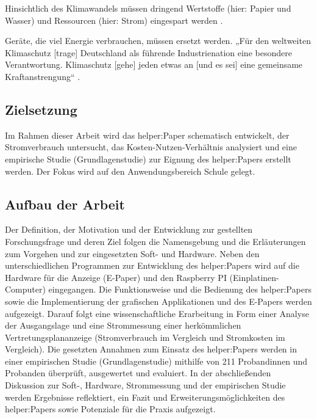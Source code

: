 \documentclass[10pt]{article}
\begin{document}
Hinsichtlich des Klimawandels müssen dringend Wertstoffe (hier: Papier und Wasser) und Ressourcen (hier: Strom) eingespart werden \cite{Ressourcenschutz}.

Geräte, die viel Energie verbrauchen, müssen ersetzt werden. „Für den weltweiten Klimaschutz [trage] Deutschland als führende Industrienation eine besondere Verantwortung. Klimaschutz [gehe] jeden etwas an [und es sei] eine gemeinsame Kraftanstrengung“ \cite{Klimaschutzprogramm}.



\subsection{Zielsetzung}
Im Rahmen dieser Arbeit wird das helper:Paper schematisch entwickelt, der Stromverbrauch untersucht, das Kosten-Nutzen-Verhältnis analysiert und eine empirische Studie (Grundlagenstudie) zur Eignung des helper:Papers erstellt werden. Der Fokus wird auf den Anwendungsbereich Schule gelegt. 


\subsection{Aufbau der Arbeit}
Der Definition, der Motivation und der Entwicklung zur gestellten Forschungsfrage und deren Ziel folgen die Namensgebung und die Erläuterungen zum Vorgehen und zur eingesetzten Soft- und Hardware. Neben den unterschiedlichen Programmen zur Entwicklung des helper:Papers wird auf die Hardware für die Anzeige (E-Paper) und den Raspberry PI (Einplatinen-Computer) eingegangen. Die Funktionsweise und die Bedienung des helper:Papers sowie die Implementierung der grafischen Applikationen und des E-Papers werden aufgezeigt. Darauf folgt eine wissenschaftliche Erarbeitung in Form einer Analyse der Ausgangslage und eine Strommessung einer herkömmlichen Vertretungsplananzeige (Stromverbrauch im Vergleich und Stromkosten im Vergleich).
Die gesetzten Annahmen zum Einsatz des helper:Papers werden in einer empirischen Studie (Grundlagenstudie) mithilfe von 211 Probandinnen und Probanden überprüft, ausgewertet und evaluiert. In der abschließenden Diskussion zur Soft-, Hardware, Strommessung und der empirischen Studie werden Ergebnisse reflektiert, ein Fazit und Erweiterungsmöglichkeiten des helper:Papers sowie Potenziale für die Praxis aufgezeigt.
\end{document}
